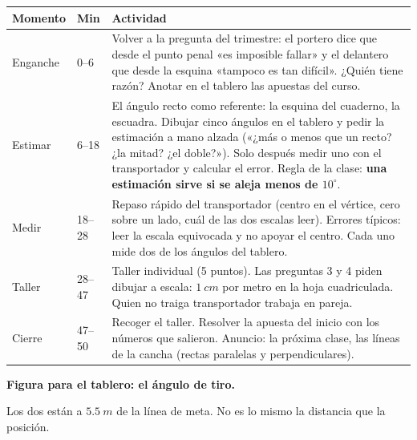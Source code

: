 \documentclass[11pt]{article}
\begin{document}
\begin{center}
{\renewcommand{\arraystretch}{1.3}
\begin{tabularx}{\linewidth}{@{}l l X@{}}
  \toprule
  \textbf{Momento} & \textbf{Min} & \textbf{Actividad}\\
  \midrule
  Enganche & 0--6 & Volver a la pregunta del trimestre: el portero dice que desde el punto
    penal «es imposible fallar» y el delantero que desde la esquina «tampoco es tan
    difícil». ¿Quién tiene razón? Anotar en el tablero las apuestas del curso.\\
  Estimar & 6--18 & El ángulo recto como referente: la esquina del cuaderno, la escuadra.
    Dibujar cinco ángulos en el tablero y pedir la estimación a mano alzada («¿más o menos
    que un recto? ¿la mitad? ¿el doble?»). Solo después medir uno con el transportador y
    calcular el error. Regla de la clase: \textbf{una estimación sirve si se aleja menos
    de $10^\circ$}.\\
  Medir & 18--28 & Repaso rápido del transportador (centro en el vértice, cero sobre un
    lado, cuál de las dos escalas leer). Errores típicos: leer la escala equivocada y no
    apoyar el centro. Cada uno mide dos de los ángulos del tablero.\\
  Taller & 28--47 & Taller individual (5 puntos). Las preguntas 3 y 4 piden dibujar a
    escala: $\qty{1}{cm}$ por metro en la hoja cuadriculada. Quien no traiga transportador
    trabaja en pareja.\\
  Cierre & 47--50 & Recoger el taller. Resolver la apuesta del inicio con los números que
    salieron. Anuncio: la próxima clase, las líneas de la cancha (rectas paralelas y
    perpendiculares).\\
  \bottomrule
\end{tabularx}}
\end{center}

\textbf{Figura para el tablero: el ángulo de tiro.}

\begin{center}

{\small Los dos están a $\qty{5,5}{m}$ de la línea de meta. No es lo mismo la distancia que
la posición.}
\end{center}
\end{document}
